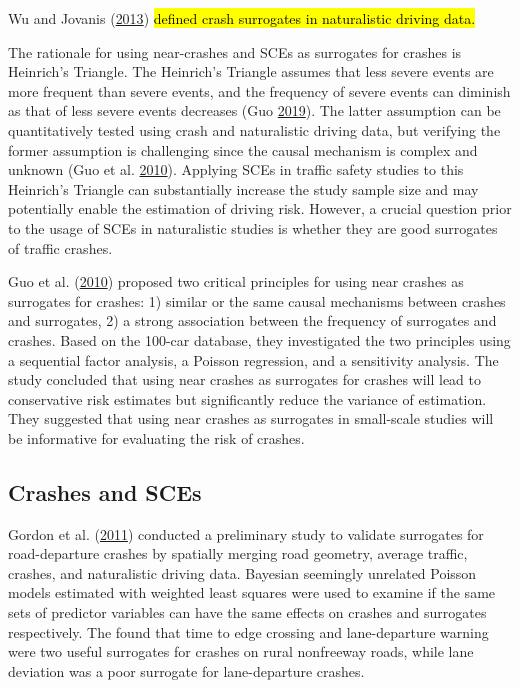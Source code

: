 \documentclass[12pt]{book}
\numberwithin{equation}{chapter}
\begin{document}
Wu and Jovanis (\protect\hyperlink{ref-wu2013defining}{2013}) \hl{defined crash surrogates in naturalistic driving data.}

The rationale for using near-crashes and SCEs as surrogates for crashes is Heinrich's Triangle. The Heinrich's Triangle assumes that less severe events are more frequent than severe events, and the frequency of severe events can diminish as that of less severe events decreases (Guo \protect\hyperlink{ref-guo2019statistical}{2019}). The latter assumption can be quantitatively tested using crash and naturalistic driving data, but verifying the former assumption is challenging since the causal mechanism is complex and unknown (Guo et al. \protect\hyperlink{ref-guo2010near}{2010}). Applying SCEs in traffic safety studies to this Heinrich's Triangle can substantially increase the study sample size and may potentially enable the estimation of driving risk. However, a crucial question prior to the usage of SCEs in naturalistic studies is whether they are good surrogates of traffic crashes.

Guo et al. (\protect\hyperlink{ref-guo2010near}{2010}) proposed two critical principles for using near crashes as surrogates for crashes: 1) similar or the same causal mechanisms between crashes and surrogates, 2) a strong association between the frequency of surrogates and crashes. Based on the 100-car database, they investigated the two principles using a sequential factor analysis, a Poisson regression, and a sensitivity analysis. The study concluded that using near crashes as surrogates for crashes will lead to conservative risk estimates but significantly reduce the variance of estimation. They suggested that using near crashes as surrogates in small-scale studies will be informative for evaluating the risk of crashes.

\hypertarget{crashes-and-sces}{%
\subsection{Crashes and SCEs}\label{crashes-and-sces}}

Gordon et al. (\protect\hyperlink{ref-gordon2011analysis}{2011}) conducted a preliminary study to validate surrogates for road-departure crashes by spatially merging road geometry, average traffic, crashes, and naturalistic driving data. Bayesian seemingly unrelated Poisson models estimated with weighted least squares were used to examine if the same sets of predictor variables can have the same effects on crashes and surrogates respectively. The found that time to edge crossing and lane-departure warning were two useful surrogates for crashes on rural nonfreeway roads, while lane deviation was a poor surrogate for lane-departure crashes.
\end{document}
